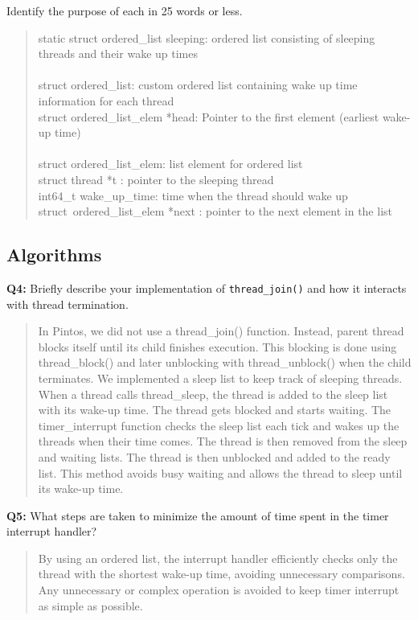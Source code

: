 \documentclass[a4paper,11pt]{paper}
\begin{document}
Identify the purpose of each in 25 words or less.
\begin{quote}

static struct ordered\_list sleeping: ordered list consisting of sleeping threads and their wake up times\\
\\
struct ordered\_list: custom ordered list containing wake up time information for each thread\\
struct ordered\_list\_elem *head: Pointer to the first element (earliest wake-up time)\\
\\
struct ordered\_list\_elem:  list element for ordered list\\
struct thread *t : pointer to the sleeping thread\\
int64\_t wake\_up\_time: time when the thread should wake up\\
struct\ ordered\_list\_elem *next : pointer to the next element in the list\\

\end{quote}


\subsection{Algorithms}


\textbf{Q4:} Briefly describe your implementation of \texttt{thread\_join()} and how it interacts with thread termination.
\begin{quote}

In Pintos, we did not use a thread\_join() function. 
	Instead, parent thread blocks itself until its child finishes execution. 
	This blocking is done using thread\_block() and later unblocking with thread\_unblock() 
	when the child terminates.
We implemented a sleep list to keep track of sleeping threads. When a thread
  calls thread\_sleep, the thread is added to the sleep list with its wake-up time. 
	The thread gets blocked and starts waiting. The timer\_interrupt 
  function checks the sleep list each tick and wakes up the threads when their time comes. 
	The thread is then removed from the sleep and waiting lists. 
	The thread is then unblocked and added to the ready list. This method
  avoids busy waiting and allows the thread to sleep until its wake-up time.
\end{quote}

\textbf{Q5:} What steps are taken to minimize the amount of time spent in the timer interrupt handler?
\begin{quote}
  By using an ordered list, the interrupt handler efficiently checks only the thread with the shortest wake-up time, avoiding unnecessary comparisons. Any unnecessary or complex operation is avoided to keep timer interrupt as simple as possible.
\end{quote}
\end{document}
